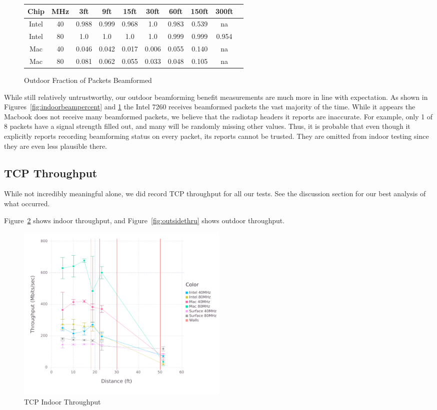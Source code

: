 \begin{figure}[b!]
\centering
\begin{tabular}{| c | c || c | c | c | c | c | c | c | c |}
\hline
Chip & MHz & 3ft & 9ft & 15ft & 30ft & 60ft & 150ft & 300ft\\ \hline
Intel & 40 & 0.988 & 0.999 & 0.968 & 1.0 & 0.983 & 0.539 & na\\ \hline
Intel & 80 & 1.0 & 1.0 & 1.0 & 1.0 & 0.999 & 0.999 & 0.954\\ \hline
Mac & 40 & 0.046 & 0.042 & 0.017 & 0.006 & 0.055 & 0.140 & na\\ \hline
Mac & 80 & 0.081 & 0.062 & 0.055 & 0.033 & 0.048 & 0.105 & na\\ \hline
\end{tabular}
\caption{Outdoor Fraction of Packets Beamformed}
\label{fig:outdoorbeampercent}
\end{figure}


While still relatively untrustworthy, our outdoor beamforming benefit
measurements are much more in line with expectation. As shown in
Figures~\ref{fig:indoorbeampercent} and \ref{fig:outdoorbeampercent}
the Intel 7260 receives beamformed packets the vast majority of the
time. While it appears the Macbook does not receive many beamformed
packets, we believe that the radiotap headers it reports are
inaccurate. For example, only 1 of 8 packets have a signal strength
filled out, and many will be randomly missing other values. Thus, it
is probable that even though it explicitly reports recording
beamforming status on every packet, its reports cannot be
trusted. They are omitted from indoor testing since they are even less
plausible there.


\subsection{TCP Throughput}
While not incredibly meaningful alone, we did record TCP throughput
for all our tests. See the discussion section for our best analysis of
what occurred.

Figure~\ref{fig:insidethru} shows indoor throughput, and
Figure~\ref{fig:outsidethru} shows outdoor throughput.

\begin{figure}[!h]
\centering
\includegraphics[width=0.5\textwidth]{figures/allchip_Inside_TCP_Throughput}
\caption{TCP Indoor Throughput}
\label{fig:insidethru}
\end{figure}

